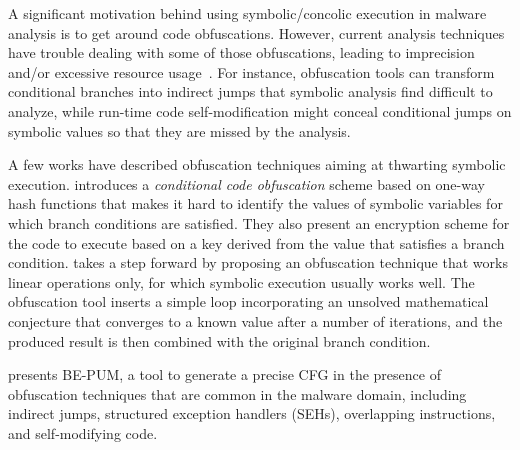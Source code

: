 A significant motivation behind using symbolic/concolic execution in malware analysis is to get around code obfuscations. However, current analysis techniques have trouble dealing with some of those obfuscations, leading to imprecision and/or excessive resource usage~\cite{YD-CCS15}. For instance, obfuscation tools can transform conditional branches into indirect jumps that symbolic analysis find difficult to analyze, while run-time code self-modification might conceal conditional jumps on symbolic values so that they are missed by the analysis.

A few works have described obfuscation techniques aiming at thwarting symbolic execution. \cite{SLG-NDSS08} introduces a {\em conditional code obfuscation} scheme based on one-way hash functions that makes it hard to identify the values of symbolic variables for which branch conditions are satisfied. They also present an encryption scheme for the code to execute based on a key derived from the value that satisfies a branch condition. %
\cite{WMJ-ESORICS11} takes a step forward by proposing an obfuscation technique that works  linear operations only, for which symbolic execution usually works well. %
The obfuscation tool inserts a simple loop incorporating an unsolved mathematical conjecture that converges to a known value after a number of iterations, and the produced result is then combined with the original branch condition. %

\cite{HOT-FPS15} presents BE-PUM, a tool to generate a precise CFG in the presence of obfuscation techniques that are common in the malware domain, including indirect jumps, structured exception handlers (SEHs), overlapping instructions, and self-modifying code.  %

